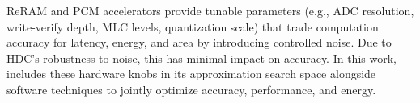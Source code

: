 ReRAM and PCM accelerators provide tunable parameters (e.g., ADC resolution, write-verify depth, MLC levels, quantization scale) that trade computation accuracy for latency, energy, and area by introducing controlled noise. Due to HDC’s robustness to noise, this has minimal impact on accuracy. In this work, \pname{} includes these hardware knobs in its approximation search space alongside software techniques to jointly optimize accuracy, performance, and energy.
 

